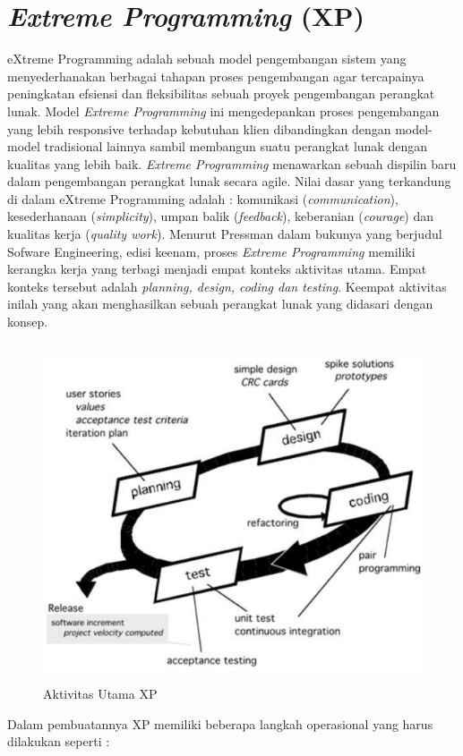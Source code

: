 \section{\textit{Extreme Programming} (XP)}
\par eXtreme Programming adalah sebuah model pengembangan sistem yang menyederhanakan berbagai tahapan proses pengembangan agar tercapainya peningkatan efsiensi dan fleksibilitas sebuah proyek pengembangan perangkat lunak. Model \textit{Extreme Programming} ini mengedepankan proses pengembangan yang lebih responsive terhadap kebutuhan klien dibandingkan dengan model- model tradisional lainnya sambil membangun suatu perangkat lunak dengan kualitas yang lebih baik. \textit{Extreme Programming} menawarkan sebuah dispilin baru dalam pengembangan perangkat lunak secara agile. Nilai dasar yang terkandung di dalam eXtreme Programming adalah : komunikasi (\textit{communication}), kesederhanaan (\textit{simplicity}), umpan balik (\textit{feedback}), keberanian (\textit{courage}) dan kualitas kerja (\textit{quality work}). Menurut Pressman dalam bukunya yang berjudul Sofware Engineering, edisi keenam, proses \textit{Extreme Programming} memiliki kerangka kerja yang terbagi menjadi empat konteks aktivitas utama. Empat konteks tersebut adalah \textit{planning, design, coding dan testing}. Keempat aktivitas inilah yang akan menghasilkan sebuah perangkat lunak yang didasari dengan konsep.
\begin{figure}[H]
	\centering
	\includegraphics [width= 12cm, height= 10cm]{gambar/xp}
	\caption{Aktivitas Utama XP}
	\label{xp}
\end{figure}
Dalam pembuatannya XP memiliki beberapa langkah operasional yang harus dilakukan seperti :

